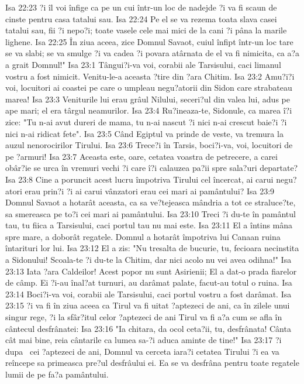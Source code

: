 Isa 22:23  ?i îl voi înfige ca pe un cui într-un loc de nadejde ?i va fi scaun de cinste pentru casa tatalui sau.
Isa 22:24  Pe el se va rezema toata slava casei tatalui sau, fii ?i nepo?i; toate vasele cele mai mici de la cani ?i pâna la marile lighene.
Isa 22:25  În ziua aceea, zice Domnul Savaot, cuiul înfipt într-un loc tare se va slabi; se va smulge ?i va cadea ?i povara atârnata de el va fi nimicita, ca a?a a grait Domnul!"
Isa 23:1  Tângui?i-va voi, corabii ale Tarsisului, caci limanul vostru a fost nimicit. Venitu-le-a aceasta ?tire din ?ara Chitim.
Isa 23:2  Amu?i?i voi, locuitori ai coastei pe care o umpleau negu?atorii din Sidon care strabateau marea!
Isa 23:3  Veniturile lui erau grâul Nilului, seceri?ul din valea lui, adus pe ape mari; el era târgul neamurilor.
Isa 23:4  Ru?ineaza-te, Sidonule, ca marea î?i zice: "Tu n-ai avut dureri de mama, tu n-ai nascut ?i nici n-ai crescut baie?i ?i nici n-ai ridicat fete".
Isa 23:5  Când Egiptul va prinde de veste, va tremura la auzul nenorocirilor Tirului.
Isa 23:6  Trece?i în Tarsis, boci?i-va, voi, locuitori de pe ?armuri!
Isa 23:7  Aceasta este, oare, cetatea voastra de petrecere, a carei obâr?ie se urca în vremuri vechi ?i care î?i calauzea pa?ii spre sala?uri departate?
Isa 23:8  Cine a poruncit acest lucru împotriva Tirului cel încercat, ai carui negu?atori erau prin?i ?i ai carui vânzatori erau cei mari ai pamântului?
Isa 23:9  Domnul Savaot a hotarât aceasta, ca sa ve?tejeasca mândria a tot ce straluce?te, sa smereasca pe to?i cei mari ai pamântului.
Isa 23:10  Treci ?i du-te în pamântul tau, tu fiica a Tarsisului, caci portul tau nu mai este.
Isa 23:11  El a întins mâna spre mare, a doborât regatele. Domnul a hotarât împotriva lui Canaan ruina întarituri lor lui.
Isa 23:12  El a zis: "Nu tresalta de bucurie, tu, fecioara necinstita a Sidonului! Scoala-te ?i du-te la Chitim, dar nici acolo nu vei avea odihna!"
Isa 23:13  Iata ?ara Caldeilor! Acest popor nu sunt Asirienii; El a dat-o prada fiarelor de câmp. Ei ?i-au înal?at turnuri, au darâmat palate, facut-au totul o ruina.
Isa 23:14  Boci?i-va voi, corabii ale Tarsisului, caci portul vostru a fost darâmat.
Isa 23:15  ?i va fi în ziua aceea ca Tirul va fi uitat ?aptezeci de ani, ca în zilele unui singur rege, ?i la sfâr?itul celor ?aptezeci de ani Tirul va fi a?a cum se afla în cântecul desfrânatei:
Isa 23:16  "Ia chitara, da ocol ceta?ii, tu, desfrânata! Cânta cât mai bine, reia cântarile ca lumea sa-?i aduca aminte de tine!"
Isa 23:17  ?i dupa  cei ?aptezeci de ani, Domnul va cerceta iara?i cetatea Tirului ?i ea va reîncepe sa primeasca pre?ul desfrâului ei. Ea se va desfrâna pentru toate regatele lumii de pe fa?a pamântului.
